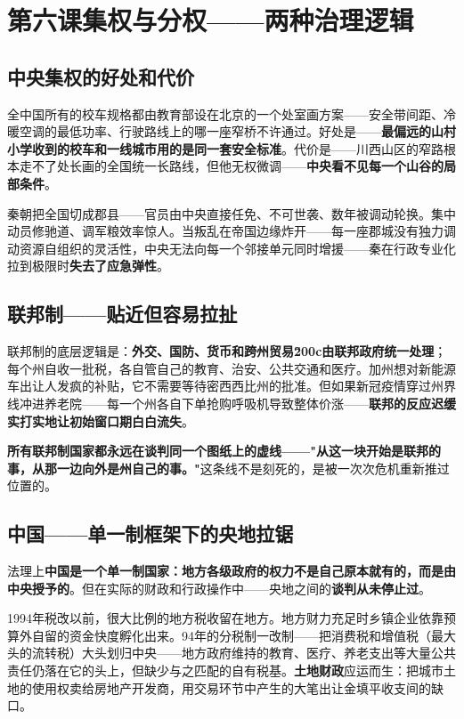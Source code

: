 \documentclass[a4paper,12pt]{ctexart}
\begin{document}
\newpage
\section{\textcolor{orange!80!black}{第六课\quad 集权与分权——两种治理逻辑}}

\subsection*{中央集权的好处和代价}

全中国所有的校车规格都由教育部设在北京的一个处室画方案——安全带间距、冷暖空调的最低功率、行驶路线上的哪一座窄桥不许通过。好处是——\textbf{最偏远的山村小学收到的校车和一线城市用的是同一套安全标准}。代价是——川西山区的窄路根本走不了处长画的全国统一长路线，但他无权微调——\textbf{中央看不见每一个山谷的局部条件}。

秦朝把全国切成郡县——官员由中央直接任免、不可世袭、数年被调动轮换。集中动员修驰道、调军粮效率惊人。当叛乱在帝国边缘炸开——每一座郡城没有独力调动资源自组织的灵活性，中央无法向每一个邻接单元同时增援——秦在行政专业化拉到极限时\textbf{失去了应急弹性}。

\subsection*{联邦制——贴近但容易拉扯}

联邦制的底层逻辑是：\textbf{外交、国防、货币和跨州贸易\u200c由联邦政府统一处理}；每个州自收一批税，各自管自己的教育、治安、公共交通和医疗。加州想对新能源车出让人发疯的补贴，它不需要等待密西西比州的批准。但如果新冠疫情穿过州界线冲进养老院——每一个州各自下单抢购呼吸机导致整体价涨——\textbf{联邦的反应迟缓实打实地让初始窗口期白白流失}。

\textbf{所有联邦制国家都永远在谈判同一个图纸上的虚线——"从这一块开始是联邦的事，从那一边向外是州自己的事。"}这条线不是刻死的，是被一次次危机重新推过位置的。

\subsection*{中国——单一制框架下的央地拉锯}

法理上\textbf{中国是一个单一制国家：地方各级政府的权力不是自己原本就有的，而是由中央授予的}。但在实际的财政和行政操作中——央地之间的\textbf{谈判从未停止过}。

1994年税改以前，很大比例的地方税收留在地方。地方财力充足时乡镇企业依靠预算外自留的资金快度孵化出来。94年的分税制一改制——把消费税和增值税（最大头的流转税）大头划归中央——地方政府维持的教育、医疗、养老支出等大量公共责任仍落在它的头上，但缺少与之匹配的自有税基。\textbf{土地财政}应运而生：把城市土地的使用权卖给房地产开发商，用交易环节中产生的大笔出让金填平收支间的缺口。
\end{document}
